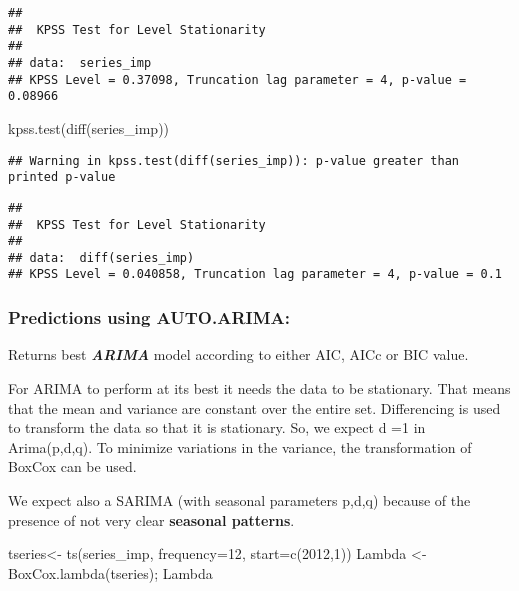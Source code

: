 \documentclass[
]{article}
\newenvironment{Shaded}{\begin{snugshade}}{\end{snugshade}}
\newcommand{\AttributeTok}[1]{\textcolor[rgb]{0.77,0.63,0.00}{#1}}
\newcommand{\DecValTok}[1]{\textcolor[rgb]{0.00,0.00,0.81}{#1}}
\newcommand{\FunctionTok}[1]{\textcolor[rgb]{0.00,0.00,0.00}{#1}}
\newcommand{\NormalTok}[1]{#1}
\newcommand{\OtherTok}[1]{\textcolor[rgb]{0.56,0.35,0.01}{#1}}
\begin{document}
\begin{verbatim}
## 
##  KPSS Test for Level Stationarity
## 
## data:  series_imp
## KPSS Level = 0.37098, Truncation lag parameter = 4, p-value = 0.08966
\end{verbatim}

\begin{Shaded}
\begin{Highlighting}[]
\FunctionTok{kpss.test}\NormalTok{(}\FunctionTok{diff}\NormalTok{(series\_imp))}
\end{Highlighting}
\end{Shaded}

\begin{verbatim}
## Warning in kpss.test(diff(series_imp)): p-value greater than printed p-value
\end{verbatim}

\begin{verbatim}
## 
##  KPSS Test for Level Stationarity
## 
## data:  diff(series_imp)
## KPSS Level = 0.040858, Truncation lag parameter = 4, p-value = 0.1
\end{verbatim}

\hypertarget{predictions-using-auto.arima}{%
\subsubsection{Predictions using
AUTO.ARIMA:}\label{predictions-using-auto.arima}}

Returns best \textbf{\emph{ARIMA}} model according to either AIC, AICc
or BIC value.

For ARIMA to perform at its best it needs the data to be stationary.
That means that the mean and variance are constant over the entire set.
Differencing is used to transform the data so that it is stationary. So,
we expect d =1 in Arima(p,d,q). To minimize variations in the variance,
the transformation of BoxCox can be used.

We expect also a SARIMA (with seasonal parameters p,d,q) because of the
presence of not very clear \textbf{seasonal patterns}.

\begin{Shaded}
\begin{Highlighting}[]
\NormalTok{tseries}\OtherTok{\textless{}{-}} \FunctionTok{ts}\NormalTok{(series\_imp, }\AttributeTok{frequency=}\DecValTok{12}\NormalTok{, }\AttributeTok{start=}\FunctionTok{c}\NormalTok{(}\DecValTok{2012}\NormalTok{,}\DecValTok{1}\NormalTok{))}
\NormalTok{Lambda }\OtherTok{\textless{}{-}} \FunctionTok{BoxCox.lambda}\NormalTok{(tseries); Lambda}
\end{Highlighting}
\end{Shaded}
\end{document}
